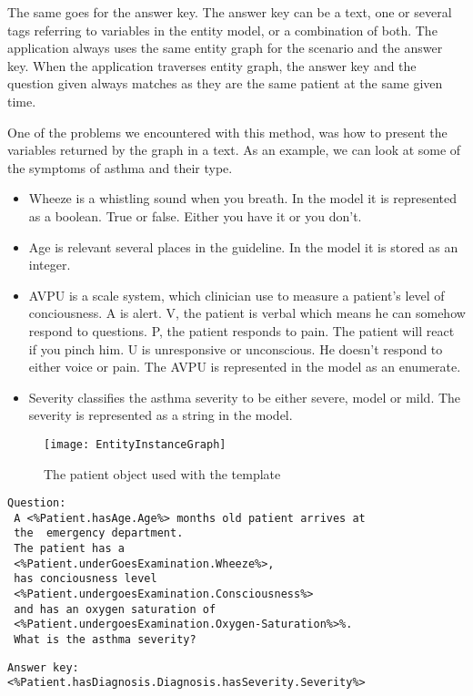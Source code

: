 The same goes for the answer key. The answer key can be a text, one or several tags referring to variables in the entity model, or a combination of both. The application always uses the same entity graph for the scenario and the answer key. When the application traverses entity graph, the answer key and the question given always matches as they are the same patient at the same given time.

One of the problems we encountered with this method, was how to present the variables returned by the graph in a text. As an example, we can look at some of the symptoms of asthma and their type.
\begin{itemize}
	\item Wheeze is a whistling sound when you breath. In the model it is represented as a boolean. True or false. Either you have it or you don't.
	\item Age is relevant several places in the guideline. In the model it is stored as an integer.
	\item AVPU is a scale system, which clinician use to measure a patient's level of conciousness. A is alert. V, the patient is verbal which means he can somehow respond to questions. P, the patient responds to pain. The patient will react if you pinch him. U is unresponsive or unconscious. He doesn't respond to either voice or pain. The AVPU is represented in the model as an enumerate.
	\item Severity classifies the asthma severity to be either severe, model or mild. The severity is represented as a string in the model.
\end{itemize}

\begin{figure}[h!]
	\caption {The patient object used with the template}
	\label{fig:EntityInstanceGraph}
	\texttt{[image: EntityInstanceGraph]}
\end{figure}

\begin{lstlisting}[caption={Question template}, frame=single] 
Question:
 A <%Patient.hasAge.Age%> months old patient arrives at 
 the  emergency department. 
 The patient has a 
 <%Patient.underGoesExamination.Wheeze%>,
 has conciousness level 
 <%Patient.undergoesExamination.Consciousness%> 
 and has an oxygen saturation of 
 <%Patient.undergoesExamination.Oxygen-Saturation%>%. 
 What is the asthma severity? 
 \end{lstlisting}
 \begin{lstlisting}[caption={Answer key template}, frame=single] 
Answer key:
<%Patient.hasDiagnosis.Diagnosis.hasSeverity.Severity%>
\end{lstlisting}

